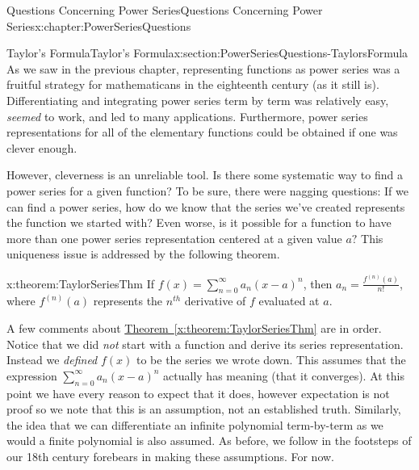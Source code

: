 
\typeout{************************************************}
\typeout{************************************************}
%
\begin{chapterptx}{Questions Concerning Power Series}{}{Questions Concerning Power Series}{}{}{x:chapter:PowerSeriesQuestions}
	\typeout{************************************************}
	\typeout{************************************************}
	\begin{sectionptx}{Taylor's Formula}{}{Taylor's Formula}{}{}{x:section:PowerSeriesQuestions-TaylorsFormula}
		As we saw in the previous chapter, representing functions as power series was a fruitful strategy for mathematicans in the eighteenth century (as it still is). Differentiating and integrating power series term by term was relatively easy, \emph{seemed} to work, and led to many applications. Furthermore, power series representations for all of the elementary functions could be obtained if one was clever enough.%
		\par
		However, cleverness is an unreliable tool. Is there some systematic way to find a power series for a given function? To be sure, there were nagging questions: If we can find a power series, how do we know that the series we've created represents the function we started with? Even worse, is it possible for a function to have more than one power series representation centered at a given value \(a?\) This uniqueness issue is addressed by the following theorem.%
		\begin{theorem}{}{}{x:theorem:TaylorSeriesThm}%
			 If \(f(x)=\sum_{n=0}^\infty a_n(x-a)^n\), then \(a_n=\frac{f^{(n)}(a)}{n!}\), where \(f^{(n)}(a)\) represents the \(n^{th}\) derivative of \(f\) evaluated at \(a\).%
		\end{theorem}
		A few comments about \hyperref[x:theorem:TaylorSeriesThm]{Theorem~{\xreffont\ref{x:theorem:TaylorSeriesThm}}} are in order. Notice that we did \emph{not} start with a function and derive its series representation. Instead we \emph{defined} \(f(x)\) to be the series we wrote down. This assumes that the expression \(\sum_{n=0}^\infty a_n(x-a)^n\) actually has meaning (that it converges). At this point we have every reason to expect that it does, however expectation is not proof so we note that this is an assumption, not an established truth. Similarly, the idea that we can differentiate an infinite polynomial term-by-term as we would a finite polynomial is also assumed. As before, we follow in the footsteps of our 18th century forebears in making these assumptions. For now.%

\end{sectionptx}
\end{chapterptx}
